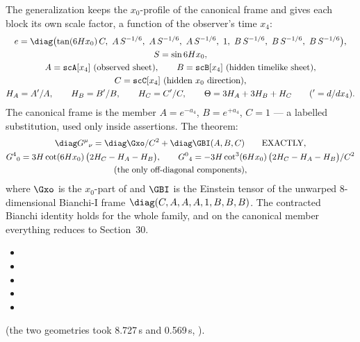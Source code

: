 The generalization keeps the $x_0$-profile of the canonical frame and gives each block its own scale
factor, a function of the observer's time $x_4$:
\begin{gather*}
  e=\diag\bigl(\tan(6Hx_0)\,C,\ A\,S^{-1/6},\ A\,S^{-1/6},\ A\,S^{-1/6},\ 1,\ B\,S^{-1/6},\ B\,S^{-1/6},\ B\,S^{-1/6}\bigr),\\
  S=\sin 6Hx_0,\\
  A=\texttt{scA}[x_4]\ \text{(observed sheet)},\qquad B=\texttt{scB}[x_4]\ \text{(hidden timelike sheet)},\\
  C=\texttt{scC}[x_4]\ \text{(hidden $x_0$ direction)},\\
  H_A=A'/A,\qquad H_B=B'/B,\qquad H_C=C'/C,\qquad \Theta=3H_A+3H_B+H_C\qquad({}'=d/dx_4).
\end{gather*}
The canonical frame is the member $A=e^{-a_4}$, $B=e^{+a_4}$, $C=1$ --- a labelled substitution, used
only inside assertions. The theorem:
\begin{gather*}
  \diag G^\mu{}_\nu=\diag\Gxo/C^2+\diag\GBI(A,B,C)\qquad\text{EXACTLY},\\
  G^4{}_0=3H\cot(6Hx_0)\,\bigl(2H_C-H_A-H_B\bigr),\qquad
  G^0{}_4=-3H\cot^3(6Hx_0)\,\bigl(2H_C-H_A-H_B\bigr)/C^2\\
  \text{(the only off-diagonal components)},
\end{gather*}
where $\Gxo$ is the $x_0$-part of  and $\GBI$ is the Einstein tensor of the unwarped
8-dimensional Bianchi-I frame $\diag(C,A,A,A,1,B,B,B)$. The contracted Bianchi identity holds for the
whole family, and on the canonical member everything reduces to Section~30. 
\begin{itemize}
  \item {}
  \item {}
  \item {}
  \item {}
  \item {}
\end{itemize}
(the two geometries took 8.727\,s and 0.569\,s, ).


